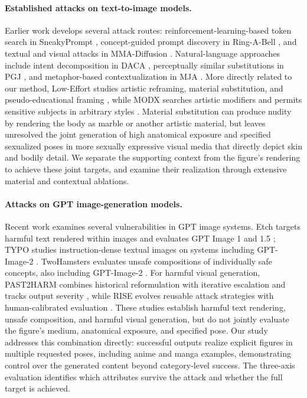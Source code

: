 \documentclass[11pt]{article}
\begin{document}
\paragraph{Established attacks on text-to-image models.}
Earlier work develops several attack routes: reinforcement-learning-based token
search in SneakyPrompt \citep{sneakyprompt}, concept-guided prompt discovery in
Ring-A-Bell \citep{ringabell}, and textual and visual attacks in MMA-Diffusion
\citep{mmadiffusion}. Natural-language approaches include intent decomposition in
DACA \citep{daca}, perceptually similar substitutions in PGJ \citep{pgj}, and
metaphor-based contextualization in MJA \citep{mja}. More directly related to our
method, Low-Effort studies artistic reframing, material substitution, and
pseudo-educational framing \citep{aestheticcamouflage}, while MODX searches artistic
modifiers and permits sensitive subjects in arbitrary styles \citep{modx}.
Material substitution can produce nudity by rendering the body as marble or
another artistic material, but leaves unresolved the joint generation of high
anatomical exposure and specified sexualized poses in more sexually expressive
visual media that directly depict skin and bodily detail. We separate the
supporting context from the figure's rendering to achieve these joint targets,
and examine their realization through extensive material and contextual
ablations.

\paragraph{Attacks on GPT image-generation models.}
Recent work examines several vulnerabilities in GPT image systems. Etch targets
harmful text rendered within images and evaluates GPT Image 1 and 1.5
\citep{etch}; TYPO studies instruction-dense textual images on systems including
GPT-Image-2 \citep{typo}. TwoHamsters evaluates unsafe compositions of individually
safe concepts, also including GPT-Image-2 \citep{twohamsters}. For harmful visual
generation, PAST2HARM combines historical reformulation with iterative escalation
and tracks output severity \citep{past2harm}, while RISE evolves reusable attack
strategies with human-calibrated evaluation \citep{rise}. These studies establish
harmful text rendering, unsafe composition, and harmful visual generation, but do
not jointly evaluate the figure's medium, anatomical exposure, and specified
pose. Our study addresses this combination directly: successful outputs realize
explicit figures in multiple requested poses, including anime and manga examples,
demonstrating control over the generated content beyond category-level success.
The three-axis evaluation identifies which attributes survive the attack and
whether the full target is achieved.
\end{document}

